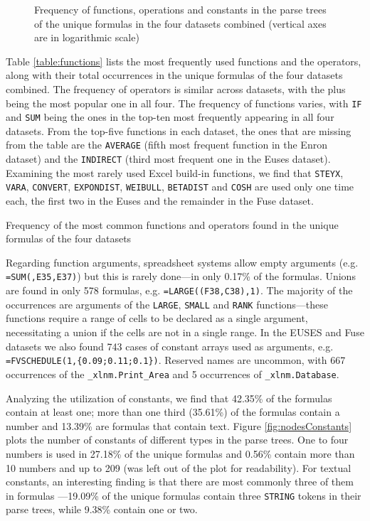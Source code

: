 \documentclass[times]{smrauth}
\begin{document}
\begin{figure}
	\caption{Frequency of functions, operations and constants in the parse trees of the unique formulas in the four datasets combined (vertical axes are in logarithmic scale)}
\end{figure}

Table \ref{table:functions} lists the most frequently used functions and the operators, along with their total occurrences in the unique formulas of the four datasets combined. The frequency of operators is similar across datasets, with the plus being the most popular one in all four. The frequency of functions varies, with \texttt{IF} and \texttt{SUM} being the ones in the top-ten most frequently appearing in all four datasets. From the top-five functions in each dataset, the ones that are missing from the table are the \texttt{AVERAGE} (fifth most frequent function in the Enron dataset) and the \texttt{INDIRECT} (third most frequent one in the Euses dataset). Examining the most rarely used Excel build-in functions, we find that \texttt{STEYX}, \texttt{VARA}, \texttt{CONVERT}, \texttt{EXPONDIST}, \texttt{WEIBULL}, \texttt{BETADIST} and \texttt{COSH} are used only one time each, the first two in the Euses and the remainder in the Fuse dataset.

\begin{table}[]
	\centering
	\caption{Frequency of the most common functions and operators found in the unique formulas of the four datasets}
	\label{table:functions}
	
\end{table}

Regarding function arguments, spreadsheet systems allow empty arguments (e.g. \texttt{=SUM(,E35,E37)}) but this is rarely done---in only 0.17\% of the formulas. Unions are found in only 578 formulas, e.g. \texttt{=LARGE((F38,C38),1)}. The majority of the occurrences are arguments of the \texttt{LARGE},  \texttt{SMALL} and \texttt{RANK} functions---these functions require a range of cells to be declared as a single argument, necessitating a union if the cells are not in a single range. In the EUSES and Fuse datasets we also found 743 cases of constant arrays used as arguments, e.g. \texttt{=FVSCHEDULE(1,\{0.09;0.11;0.1\})}. Reserved names are uncommon, with 667 occurrences of the \texttt{_xlnm.Print_Area} and 5 occurrences of \texttt{_xlnm.Database}.

Analyzing the utilization of constants, we find that 42.35\% of the formulas contain at least one; more than one third (35.61\%) of the formulas contain a number and 13.39\% are formulas that contain text. Figure \ref{fig:nodesConstants} plots the number of constants of different types in the parse trees. One to four numbers is used in 27.18\% of the unique formulas and 0.56\% contain more than 10 numbers and up to 209 (was left out of the plot for readability). For textual constants, an interesting finding is that there are most commonly three of them in formulas ---19.09\% of the unique formulas contain three \texttt{STRING} tokens in their parse trees, while 9.38\% contain one or two.
\end{document}
